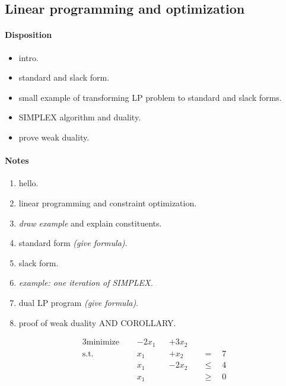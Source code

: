 \newpage

\subsection{Linear programming and optimization}

\paragraph{Disposition}
\begin{itemize}
  \item intro.
  \item standard and slack form.
  \item small example of transforming LP problem to standard and slack forms.
  \item SIMPLEX algorithm and duality.
  \item prove weak duality.
\end{itemize}

\paragraph{Notes}

\begin{enumerate}
  \item hello.

  \item linear programming and constraint optimization.\\

  \item \emph{draw example} and explain constituents.

  \item standard form \emph{(give formula)}.

  \item slack form.\\

  \item \emph{example: one iteration of SIMPLEX.}

  \item dual LP program \emph{(give formula)}.

  \item proof of weak duality AND COROLLARY.
\end{enumerate}

\begin{alignat*}{3}
  \text{minimize } \quad& -2x_1 && +3 x_2  \quad&\\
  \text{s.t.     } \quad& x_1   && + x_2   \quad&=\quad 7\\
                        & x_1   && -2x_2   \quad&\leq\quad 4\\
                        & x_1   &&         \quad&\geq \quad0
\end{alignat*}
